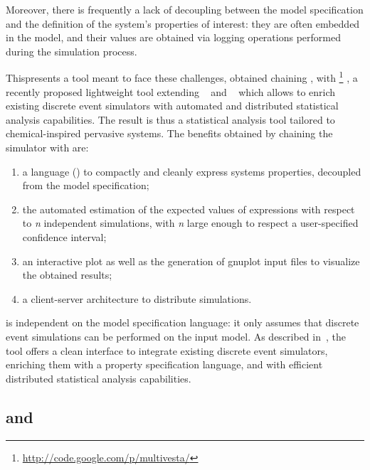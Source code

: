 \documentclass[12pt,a4paper,twoside,openright]{book}
\begin{document}
Moreover, there is frequently a lack of decoupling between the model specification and the definition of the system's properties of interest: they are often embedded in the model, and their values are obtained via logging operations performed during the simulation process.

This\levelText{}presents a tool meant to face these challenges, obtained chaining \alchemist{}, with \multivesta{}\footnote{\url{http://code.google.com/p/multivesta/}} \cite{multivesta}, a recently proposed lightweight tool extending \vesta{}~\cite{Sen:2005} and \pvesta{}~\cite{AlTurkiM11} which allows to enrich existing discrete event simulators with automated and distributed statistical analysis capabilities.
%
The result is thus a statistical analysis tool tailored to chemical-inspired pervasive systems.
%
The benefits obtained by chaining the simulator with \multivesta{} are:
\begin{enumerate}
 \item a language (\multiquatex) to compactly and cleanly express systems properties, decoupled from the model specification;
 \item the automated estimation of the expected values of \multiquatex{} expressions with respect to \emph{n} independent simulations, with \emph{n} large enough to respect a user-specified confidence interval;
 \item an interactive plot as well as the generation of gnuplot input files to visualize the obtained results;
 \item a client-server architecture to distribute simulations.
\end{enumerate}

\multivesta{} is independent on the model specification language: it only assumes that discrete event simulations can be performed on the input model.
%
As described in~\cite{multivesta}, the tool offers a clean interface to integrate existing discrete event simulators, enriching them with a property specification language, and with efficient distributed statistical analysis capabilities.

\subsection{\multivesta{} and \multiquatex{}}
\end{document}
